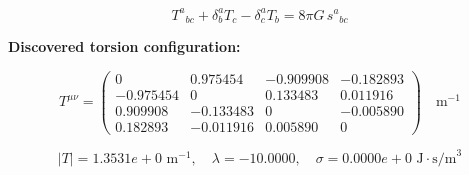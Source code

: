 
\begin{equation}
  T^a{}_{bc} + \delta^a_b T_c - \delta^a_c T_b = 8\pi G \, s^a{}_{bc}
\end{equation}

\textbf{Discovered torsion configuration:}

\begin{equation}
  T^{\mu\nu} = \begin{pmatrix}
    0 & 0.975454 & -0.909908 & -0.182893 \\
    -0.975454 & 0 & 0.133483 & 0.011916 \\
    0.909908 & -0.133483 & 0 & -0.005890 \\
    0.182893 & -0.011916 & 0.005890 & 0
  \end{pmatrix} \quad \text{m}^{-1}
\end{equation}

\begin{equation}
  |T| = 1.3531e+0 \text{ m}^{-1}, \quad
  \lambda = -10.0000, \quad
  \sigma = 0.0000e+0 \text{ J}\cdot\text{s/m}^3
\end{equation}